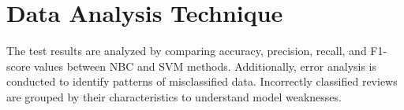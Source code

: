 \section{Data Analysis Technique}

The test results are analyzed by comparing accuracy, precision, recall, and F1-score values between NBC and SVM methods. Additionally, error analysis is conducted to identify patterns of misclassified data. Incorrectly classified reviews are grouped by their characteristics to understand model weaknesses.
